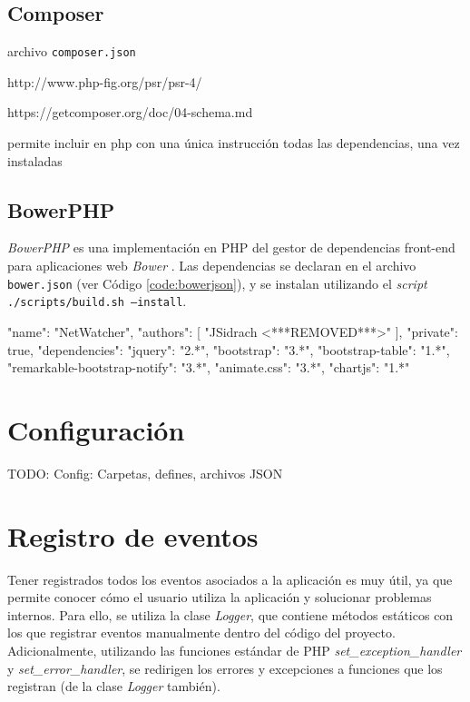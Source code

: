 \subsection*{Composer\label{extra:mvc:composer}}

archivo \texttt{composer.json}

http://www.php-fig.org/psr/psr-4/

https://getcomposer.org/doc/04-schema.md

permite incluir en php con una única instrucción todas las dependencias, una vez instaladas

\subsection*{BowerPHP\label{extra:mvc:bowerphp}}

\textit{BowerPHP} es una implementación en \gls{PHP} del gestor de dependencias \gls{front-end} para aplicaciones web \textit{Bower} \cite{bower}. Las dependencias se declaran en el archivo \texttt{bower.json} (ver Código \ref{code:bowerjson}), y se instalan utilizando el \textit{script} \texttt{./scripts/build.sh --install}.

\begin{code}[label=code:bowerjson,language=json,caption=Ejemplo de fichero \textit{bower.json}]
{
  "name": "NetWatcher",
  "authors": [
    "JSidrach <***REMOVED***>"
  ],
  "private": true,
  "dependencies": {
    "jquery": "2.*",
    "bootstrap": "3.*",
    "bootstrap-table": "1.*",
    "remarkable-bootstrap-notify": "3.*",
    "animate.css": "3.*",
    "chartjs": "1.*"
  }
}
\end{code}

\section{Configuración\label{extra:mvc:config}}

TODO: Config: Carpetas, defines, archivos JSON

\section{Registro de eventos\label{extra:mvc:logger}}

Tener registrados todos los eventos asociados a la aplicación es muy útil, ya que permite conocer cómo el usuario utiliza la aplicación y solucionar problemas internos. Para ello, se utiliza la clase \textit{Logger}, que contiene métodos estáticos con los que registrar eventos manualmente dentro del código del proyecto. Adicionalmente, utilizando las funciones estándar de \gls{PHP} \textit{set\_exception\_handler} y \textit{set\_error\_handler}, se redirigen los errores y excepciones a funciones que los registran (de la clase \textit{Logger} también).

